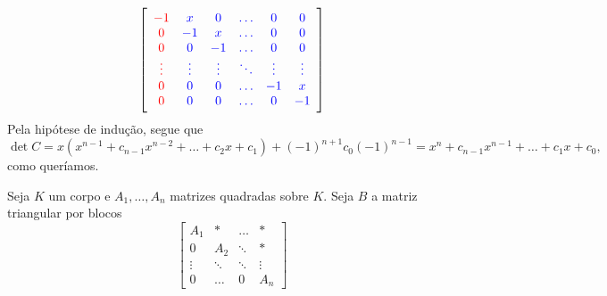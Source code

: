 \documentclass[11pt,a4paper]{article}
\begin{document}
{\[\left[ \begin{array}{cccccc} \textcolor{red}{-1} & \textcolor{blue}{x} &\textcolor{blue}{0} & \textcolor{blue}{\ldots} & \textcolor{blue}{0} & \textcolor{blue}{0}  \\ \textcolor{red}{0} & \textcolor{blue}{-1} & \textcolor{blue}{x} & \textcolor{blue}{\ldots} & \textcolor{blue}{0} & \textcolor{blue}{0} \\ \textcolor{red}{0} & \textcolor{blue}{0} & \textcolor{blue}{-1} & \textcolor{blue}{\ldots} & \textcolor{blue}{0} & \textcolor{blue}{0} \\ \textcolor{red}{\vdots} & \textcolor{blue}{\vdots} & \textcolor{blue}{\vdots} & \textcolor{blue}{\ddots} & \textcolor{blue}{\vdots} & \textcolor{blue}{\vdots} \\  \textcolor{red}{0} & \textcolor{blue}{0} & \textcolor{blue}{0} & \textcolor{blue}{\ldots} & \textcolor{blue}{-1} & \textcolor{blue}{x}  \\  \textcolor{red}{0} & \textcolor{blue}{0} & \textcolor{blue}{0} & \textcolor{blue}{\ldots} & \textcolor{blue}{0} & \textcolor{blue}{-1} \end{array} \right]
\]
Pela hipótese de indução, segue que\[ \det C = x(x^{n-1} + c_{n-1}x^{n-2} + \ldots + c_2x + c_1) + (-1)^{n+1} c_0 (-1)^{n-1} = x^n + c_{n-1}x^{n-1} + \ldots + c_1x + c_0,\]
como queríamos.



}

 Seja $K$ um corpo e $A_1, \ldots, A_n$ matrizes quadradas sobre $K$. Seja $B$ a matriz triangular por blocos 
\[
 \left[ \begin{array}{cccc} A_1 & * & \ldots & * \\ 0 & A_2 & \ddots & * \\ \vdots & \ddots & \ddots & \vdots  \\ 0 & \ldots & 0 & A_n \end{array} \right]
\]
\end{document}
